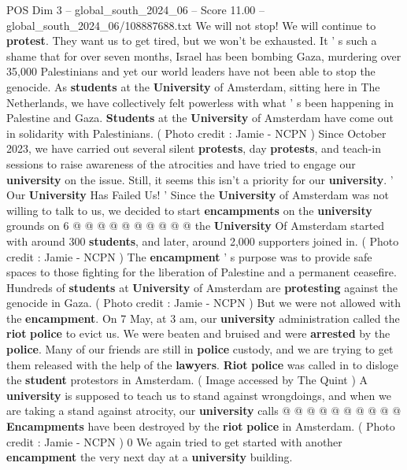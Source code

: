 \begin{textsample}{POS Dim 3 – global\_south\_2024\_06 – Score 11.00 – global\_south\_2024\_06/108887688.txt}  \label{ex:f3_pos_342}
We will not stop!
We will continue to \textbf{protest}.
They want us to get tired, but we won't be exhausted.
It ' s such a shame that for over seven months, Israel has been bombing Gaza, murdering over 35,000 Palestinians and yet our world leaders have not been able to stop the genocide.
As \textbf{students} at the \textbf{University} of Amsterdam, sitting here in The Netherlands, we have collectively felt powerless with what ' s been happening in Palestine and Gaza. \textbf{Students} at the \textbf{University} of Amsterdam have come out in solidarity with Palestinians. ( Photo credit : Jamie - NCPN ) Since October 2023, we have carried out several silent \textbf{protests}, day \textbf{protests}, and teach-in sessions to raise awareness of the atrocities and have tried to engage our \textbf{university} on the issue.
Still, it seems this isn't a priority for our \textbf{university}. ' Our \textbf{University} Has Failed Us! ' Since the \textbf{University} of Amsterdam was not willing to talk to us, we decided to start \textbf{encampments} on the \textbf{university} grounds on 6 @ @ @ @ @ @ @ @ @ @ the \textbf{University} Of Amsterdam started with around 300 \textbf{students}, and later, around 2,000 supporters joined in. ( Photo credit : Jamie - NCPN ) The \textbf{encampment} ' s purpose was to provide safe spaces to those fighting for the liberation of Palestine and a permanent ceasefire.
Hundreds of \textbf{students} at \textbf{University} of Amsterdam are \textbf{protesting} against the genocide in Gaza. ( Photo credit : Jamie - NCPN ) But we were not allowed with the \textbf{encampment}.
On 7 May, at 3 am, our \textbf{university} administration called the \textbf{riot} \textbf{police} to evict us.
We were beaten and bruised and were \textbf{arrested} by the \textbf{police}.
Many of our friends are still in \textbf{police} custody, and we are trying to get them released with the help of the \textbf{lawyers}. \textbf{Riot} \textbf{police} was called in to disloge the \textbf{student} protestors in Amsterdam. ( Image accessed by The Quint ) A \textbf{university} is supposed to teach us to stand against wrongdoings, and when we are taking a stand against atrocity, our \textbf{university} calls @ @ @ @ @ @ @ @ @ @ \textbf{Encampments} have been destroyed by the \textbf{riot} \textbf{police} in Amsterdam. ( Photo credit : Jamie - NCPN ) 0 We again tried to get started with another \textbf{encampment} the very next day at a \textbf{university} building.

\end{textsample}
